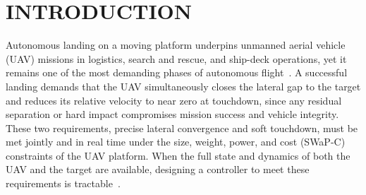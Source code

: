 \documentclass{IEEEtaes}
\begin{document}

\section{INTRODUCTION} \label{intro: section}
Autonomous landing on a moving platform underpins unmanned aerial vehicle (UAV) missions in logistics, search and rescue, and ship-deck operations, yet it remains one of the most demanding phases of autonomous flight~\cite{cho2022,gupta2023,angelis2026}. A successful landing demands that the UAV simultaneously closes the lateral gap to the target and reduces its relative velocity to near zero at touchdown, since any residual separation or hard impact compromises mission success and vehicle integrity. These two requirements, precise lateral convergence and soft touchdown, must be met jointly and in real time under the size, weight, power, and cost (SWaP-C) constraints of the UAV platform. When the full state and dynamics of both the UAV and the target are available, designing a controller to meet these requirements is tractable~\cite{kumar2024,marcon2018}.
\end{document}

